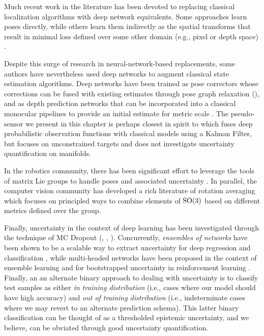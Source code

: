 %


Much recent work in the literature has been devoted to replacing classical localization algorithms with deep network equivalents. Some approaches \citep{Clark2017, Kendall2015-ew, Kendall2017-ud, Melekhov2017-dl} learn poses  directly, while others learn them indirectly as the spatial transforms that result in minimal loss defined over some other domain (e.g., pixel or depth space) \citep{Byravan2017-ik, Handa2016-hm}.

Despite this surge of research in neural-network-based replacements, some authors have nevertheless used deep networks to augment classical state estimation algorithms. Deep networks have been trained as pose correctors whose corrections can be fused with existing estimates through pose graph relaxation (), and as  depth prediction networks that can be incorporated into a classical monocular pipelines to provide an initial estimate for metric scale \citep{yang:2018}. The pseudo-sensor we present in this chapter is perhaps closest in spirit to \citep{Haarnoja2016-ph} which fuses deep probabilistic observation functions with classical models using a Kalman Filter, but focuses on unconstrained targets and does not investigate uncertainty quantification on manifolds.

In the robotics community, there has been significant effort to leverage the tools of matrix Lie groups to handle poses and associated uncertainty \citep{Sola2018-kg, Barfoot2014-ac}. In parallel, the computer vision community has developed a rich literature of rotation averaging \citep{Hartley2013-rc} which focuses on principled ways to combine elements of $\mathrm{SO}(3)$ based on different metrics defined over the group.

Finally, uncertainty in the context of deep learning has been investigated through the technique of MC Dropout (, \cite{Gal2016UncertaintyThesis}, \cite{Kendall2017-vs}). Concurrently, \textit{ensembles of networks} have been shown to be a scalable way to extract uncertainty for deep regression and classification  \citep{Lakshminarayanan2017}, while multi-headed networks have been proposed in the context of ensemble learning \citep{Lee2015-af} and for bootstrapped uncertainty in reinforcement learning \citep{Osband2016}. Finally, an an alternate binary approach \citep{richter2017safe} to dealing with uncertainty is to classify test samples as either \textit{in training distribution} (i.e., cases where our model should have high accuracy) and \textit{out of training distribution} (i.e., indeterminate cases where we may revert to an alternate prediction schema). This latter binary classification can be thought of as a thresholded epistemic uncertainty, and we believe, can be obviated through good uncertainty quantification. 

